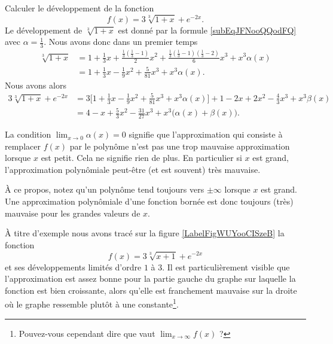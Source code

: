 \begin{example} \label{ExKPBooJmdFvY}
    Calculer le développement de la fonction
    \begin{equation}
        f(x)=3\sqrt[3]{1+x}+ e^{-2x}.
    \end{equation}
    Le développement de \( \sqrt[3]{1+x}\) est donné par la formule \eqref{subEqJFNooQQodFQ} avec \( \alpha=\frac{1}{ 3 }\). Nous avons donc dans un premier temps
    \begin{subequations}
        \begin{align}
            \sqrt[3]{1+x}&=1+\frac{ 1 }{ 3 }x+\frac{ \frac{1}{ 3 }\left( \frac{1}{ 3 }-1 \right) }{ 2 }x^2+\frac{ \frac{1}{ 3 }\left( \frac{1}{ 3 }-1 \right)\left( \frac{1}{ 3 }-2 \right) }{ 6 }x^3+x^3\alpha(x)\\
            &=1+\frac{1}{ 3 }x-\frac{1}{ 9 }x^2+\frac{ 5 }{ 81 }x^3+x^3\alpha(x).
        \end{align}
    \end{subequations}
    Nous avons alors
    \begin{subequations}
        \begin{align}
            3\sqrt[3]{1+x}+ e^{-2x}&=3\Big[  1+\frac{1}{ 3 }x-\frac{1}{ 9 }x^2+\frac{ 5 }{ 81 }x^3+x^3\alpha(x)\Big]+1-2x+2x^2-\frac{ 4 }{ 3 }x^3+x^3\beta(x)\\
            &=4-x+\frac{ 5 }{ 3 }x^2-\frac{ 31 }{ 27 }x^3+x^3\big( \alpha(x)+\beta(x) \big).
        \end{align}
    \end{subequations}

\end{example}

La condition \( \lim_{x\to 0} \alpha(x)=0\) signifie que l'approximation qui consiste à remplacer \( f(x) \) par le polynôme n'est pas une trop mauvaise approximation lorsque \( x\) est petit. Cela ne signifie rien de plus. En particulier si \( x\) est grand, l'approximation polynômiale peut-être (et est souvent) très mauvaise.

À ce propos, notez qu'un polynôme tend toujours vers \( \pm\infty\) lorsque \( x\) est grand. Une approximation polynômiale d'une fonction bornée est donc toujours (très) mauvaise pour les grandes valeurs de \( x\).

À titre d'exemple nous avons tracé sur la figure \ref{LabelFigWUYooCISzeB} la fonction
\begin{equation}
    f(x)=3\sqrt[3]{x+1}+ e^{-2x}
\end{equation}
et ses développements limités d'ordre \( 1\) à \( 3\). Il est particulièrement visible que l'approximation est assez bonne pour la partie gauche du graphe sur laquelle la fonction est bien croissante, alors qu'elle est franchement mauvaise sur la droite où le graphe ressemble plutôt à une constante\footnote{Pouvez-vous cependant dire que vaut \( \lim_{x\to \infty} f(x)\) ?}.

